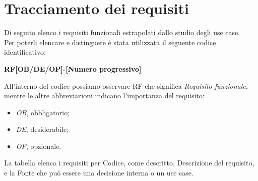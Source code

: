 \section{Tracciamento dei requisiti}
Di seguito elenco i requisiti funzionali estrapolati dallo studio degli use case.\\
Per poterli elencare e distinguere è stata utilizzata il seguente codice identificativo:
\begin{center}
\textbf{RF[OB/DE/OP]-[Numero progressivo]}
\end{center}
All'interno del codice possiamo osservare RF che significa \textit{Requisito funzionale}, mentre le altre abbreviazioni indicano l'importanza del requisito:
\begin{itemize}
\item \textit{OB}, obbligatorio;
\item \textit{DE}, desiderabile;
\item \textit{OP}, opzionale.
\end{itemize}
La tabella elenca i requisiti per Codice, come descritto, Descrizione del requisito, e la Fonte che può essere una decisione interna o un use case.
\setlength{\arrayrulewidth}{0.3mm}
\renewcommand{\arraystretch}{2.5}
